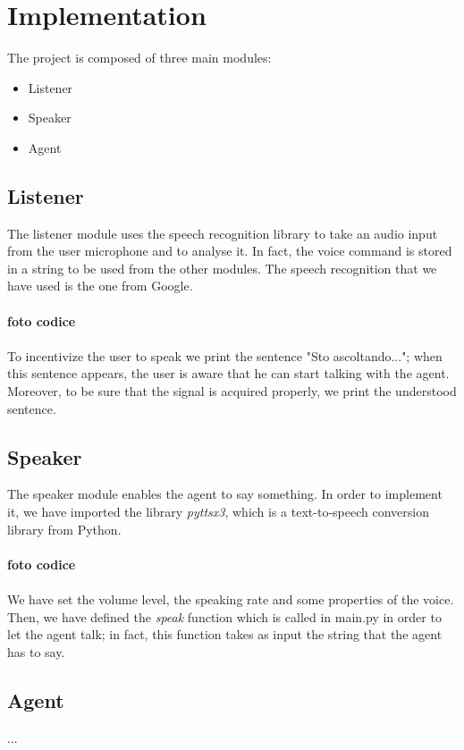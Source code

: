 \documentclass{article}
\begin{document}
\section{Implementation}
The project is composed of three main modules:
\begin{itemize}
\item Listener
\item Speaker
\item Agent
\end{itemize}
\subsection{Listener}
The listener module uses the speech recognition library to take an audio input from the user microphone and to analyse it. In fact, the voice command is stored in a string to be used from the other modules. The speech recognition that we have used is the one from Google.\\\\
\textbf{foto codice}\\\\
To incentivize the user to speak we print the sentence "Sto ascoltando..."; when this sentence appears, the user is aware that he can start talking with the agent. Moreover, to be sure that the signal is acquired properly, we print the understood sentence.
\subsection{Speaker}
The speaker module enables the agent to say something. In order to implement it, we have imported the library \textit{pyttsx3}, which is a text-to-speech conversion library from Python.\\\\
\textbf{foto codice}\\\\
We have set the volume level, the speaking rate and some properties of the voice. Then, we have defined the \textit{speak} function which is called in main.py in order to let the agent talk; in fact, this function takes as input the string that the agent has to say.
\subsection{Agent}
...
\end{document}

